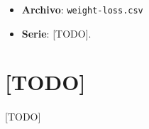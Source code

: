 \documentclass[a4paper, spanish]{article}
\begin{document}
  \maketitle

  \begin{itemize}
    \item \textbf{Archivo}: \texttt{weight-loss.csv}
    \item \textbf{Serie}: [TODO].
  \end{itemize}

  \section{[TODO]}

    \paragraph{}
    [TODO]
\end{document}
